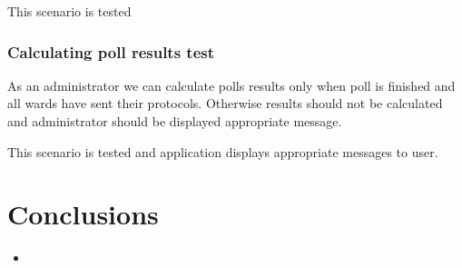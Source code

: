 \documentclass[a4paper,twoside,12pt]{book}
\newcounter{PagesWithoutNumbers}
\begin{document}
      This scenario is tested %

    \subsection{Calculating poll results test}
      As an administrator we can calculate polls results only when poll is finished and all wards have sent their protocols.
      Otherwise results should not be calculated and administrator should be displayed appropriate message.
      
      This scenario is tested and application displays appropriate messages to user.

\chapter{Conclusions}

\begin{itemize}
\item 
\end{itemize}

 


\backmatter
{}
\setcounter{page}{\value{PagesWithoutNumbers}}

\pagestyle{onlyPageNumbers}




\end{document}
